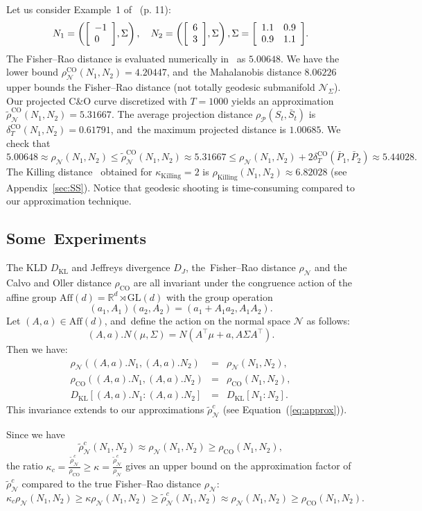 \documentclass[entropy,article,accept,oneauthor,pdftex,entropy]{Definitions/mdpi}
\def\CO{\mathrm{CO}}
\def\GL{\mathrm{GL}}
\def\KL{\mathrm{KL}}
\def\Killing{\mathrm{Killing}}
\def\Aff{\mathrm{Aff}}
\def\bbR{\mathbb{R}}
\def\vectortwo#1#2{{\left[\begin{array}{l}#1 \cr #2\end{array}\right]}}
\def\mattwotwo#1#2#3#4{{\left[\begin{array}{ll}#1 & #2\cr #3 & #4\end{array}\right]}}
\def\calN{\mathcal{N}}
\def\calP{\mathcal{P}}
\def\Aff{\mathrm{Aff}}
\def\bbR{\mathbb{R}}
\begin{document}
 
\begin{Example}\label{ex1entropy}
Let us consider Example~1 of~\cite{FRMVNReview-2020} (p. 11):
$$
N_1=\left(\vectortwo{-1}{0},\Sigma\right),\quad
N_2=\left(\vectortwo{6}{3},\Sigma\right), \Sigma=\mattwotwo{1.1}{0.9}{0.9}{1.1}.
$$
{The Fisher–Rao distance is evaluated numerically in~\cite{FRMVNReview-2020} as $5.00648$.
We have the lower bound $\rho_\calN^\CO(N_1,N_2)=4.20447$, and~the Mahalanobis distance $8.06226$ upper bounds the Fisher–Rao distance (not totally geodesic submanifold $\calN_\Sigma$).
Our projected C\&O curve discretized with $T=1000$ yields an approximation $\tilde\rho_\calN^\CO(N_1,N_2)=5.31667$.
The average projection distance $\rho_\calP(S_t,\bar S_{t})$ is $\delta^\CO_T(N_1,N_2)=0.61791$, and~the maximum projected distance is $1.00685$.
We check that}
$$
5.00648\approx \rho_\calN(N_1,N_2)\leq \tilde\rho_\calN^\CO(N_1,N_2)\approx 5.31667 \leq \rho_\calN(N_1,N_2) + 2 \delta^\CO_T(\bar P_1,\bar P_2)\approx 5.44028.
$$
The Killing distance~\cite{lovric2000multivariate} obtained for $\kappa_\Killing=2$ is $\rho_\Killing(N_1,N_2)\approx 6.82028$ (see Appendix~\ref{sec:SS}).
Notice that geodesic shooting is time-consuming compared to our approximation technique.
\end{Example}
 
 
 
\subsection{Some~Experiments}\label{sec:exp}

The KLD $D_\KL$ and Jeffreys divergence $D_J$, the~Fisher–Rao distance $\rho_\calN$ and the Calvo and Oller distance $\rho_\CO$ are all invariant under the congruence action of the affine group $\Aff(d)=\bbR^d\rtimes\GL(d)$ with the group operation 
$$
(a_1,A_1)(a_2,A_2)=(a_1+A_1a_2,A_1A_2).
$$
Let $(A,a)\in\Aff(d)$, and~define the action on the normal space $\calN$ as follows:
$$
(A,a).N(\mu,\Sigma)=N(A^\top\mu+a,A\Sigma A^\top).
$$
Then we have:
\begin{eqnarray*}
\rho_{\calN}((A,a).N_1,(A,a).N_2)&=& \rho_{\calN}(N_1,N_2),\\
\rho_{\CO}((A,a).N_1,(A,a).N_2)&=&\rho_{\CO}(N_1,N_2),\\ 
D_\KL[(A,a).N_1:(A,a).N_2]&=&D_\KL[N_1:N_2].
\end{eqnarray*}
This invariance extends to our approximations $\tilde\rho^c_\calN$ (see Equation~(\ref{eq:approx})).
 
Since we have 
$$
\tilde\rho_{\calN}^c(N_1,N_2)\approx \rho_{\calN}(N_1,N_2)\geq \rho_{\CO}(N_1,N_2),
$$
the ratio $\kappa_c=\frac{\tilde\rho_{\calN}^c}{\rho_{\CO}}\geq \kappa=\frac{\tilde\rho_{\calN}^c}{\rho_{\calN}}$ gives an upper bound on the approximation factor of $\tilde\rho_{\calN}^c$ compared to the true Fisher–Rao distance $\rho_{\calN}$:
$$
\kappa_c \rho_{\calN}(N_1,N_2)\geq \kappa \rho_{\calN}(N_1,N_2)\geq \tilde\rho_{\calN}^c(N_1,N_2)\approx \rho_{\calN}(N_1,N_2) \geq \rho_{\CO}(N_1,N_2).
$$
\end{document}

